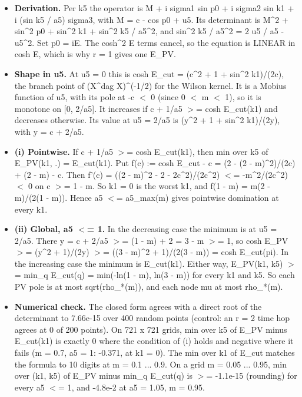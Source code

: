 \documentclass[11pt,a4paper]{article}
\begin{document}
\begin{itemize}
\item{} {\bfseries\boldmath Derivation.} Per k5 the operator is M + i sigma1 sin p0 + i sigma2 sin k1 + i (sin k5 / a5) sigma3, with
M = c - cos p0 + u5. Its determinant is M\textasciicircum{}2 + sin\textasciicircum{}2 p0 + sin\textasciicircum{}2 k1 + sin\textasciicircum{}2 k5 / a5\textasciicircum{}2, and
sin\textasciicircum{}2 k5 / a5\textasciicircum{}2 = 2 u5 / a5 - u5\textasciicircum{}2. Set p0 = iE. The cosh\textasciicircum{}2 E terms cancel, so the equation is LINEAR in cosh E,
which is why r = 1 gives one E\_PV.
\item{} {\bfseries\boldmath Shape in u5.} At u5 = 0 this is cosh E\_cut = (c\textasciicircum{}2 + 1 + sin\textasciicircum{}2 k1)/(2c), the branch point of (X\textasciicircum{}dag X)\textasciicircum{}(-1/2)
for the Wilson kernel. It is a Mobius function of u5, with its pole at -c $<$ 0 (since 0 $<$ m $<$ 1), so it is monotone
on [0, 2/a5]. It increases if c + 1/a5 $>$= cosh E\_cut(k1) and decreases otherwise. Its value at u5 = 2/a5 is
(y\textasciicircum{}2 + 1 + sin\textasciicircum{}2 k1)/(2y), with y = c + 2/a5.
\item{} {\bfseries\boldmath (i) Pointwise.} If c + 1/a5 $>$= cosh E\_cut(k1), then min over k5 of E\_PV(k1, .) = E\_cut(k1). Put
f(c) := cosh E\_cut - c = (2 - (2 - m)\textasciicircum{}2)/(2c) + (2 - m) - c. Then f'(c) = ((2 - m)\textasciicircum{}2 - 2 - 2c\textasciicircum{}2)/(2c\textasciicircum{}2)
$<$= -m\textasciicircum{}2/(2c\textasciicircum{}2) $<$ 0 on c $>$= 1 - m. So k1 = 0 is the worst k1,
and f(1 - m) = m(2 - m)/(2(1 - m)). Hence a5 $<$= a5\_max(m) gives pointwise domination at every k1.
\item{} {\bfseries\boldmath (ii) Global, a5 $<$= 1.} In the decreasing case the minimum is at u5 = 2/a5. There y = c + 2/a5 $>$= (1 - m) + 2 =
3 - m $>$= 1, so cosh E\_PV $>$= (y\textasciicircum{}2 + 1)/(2y) $>$= ((3 - m)\textasciicircum{}2 + 1)/(2(3 - m)) = cosh E\_cut(pi). In the increasing case
the minimum is E\_cut(k1). Either way, E\_PV(k1, k5) $>$= min\_q E\_cut(q) = min(-ln(1 - m), ln(3 - m)) for every k1 and
k5. So each PV pole is at most sqrt(rho\_*(m)), and each node mu at most rho\_*(m).
\item{} {\bfseries\boldmath Numerical check.} The closed form agrees with a direct root of the determinant to 7.66e-15 over 400 random
points (control: an r = 2 time hop agrees at 0 of 200 points). On 721 x 721 grids, min over k5 of E\_PV minus
E\_cut(k1) is exactly 0 where the condition of (i) holds and negative where it fails (m = 0.7, a5 = 1: -0.371, at
k1 = 0). The min over k1 of E\_cut matches the formula to 10 digits at m = 0.1 ... 0.9. On a grid m = 0.05 ...
0.95, min over (k1, k5) of E\_PV minus min\_q E\_cut(q) is $>$= -1.1e-15 (rounding) for every a5 $<$= 1, and -4.8e-2 at a5 = 1.05,
m = 0.95.
\end{itemize}
\end{document}
